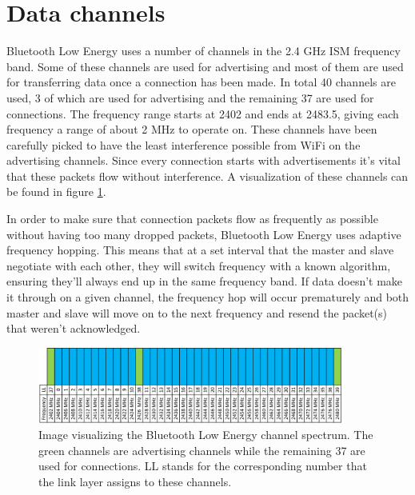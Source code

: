 \documentclass[pdftex,a4paper,12pt,twoside]{report}
\begin{document}
\section{Data channels}
\label{sec:channels}
Bluetooth Low Energy uses a number of channels in the 2.4 GHz ISM frequency band. Some of these channels are used for advertising and most of them are used for transferring data once a connection has been made. In total 40 channels are used, 3 of which are used for advertising and the remaining 37 are used for connections. The frequency range starts at 2402 and ends at 2483.5, giving each frequency a range of about 2 MHz to operate on. These channels have been carefully picked to have the least interference possible from WiFi on the advertising channels. Since every connection starts with advertisements it's vital that these packets flow without interference. A visualization of these channels can be found in figure \ref{fig:channelmap}.

In order to make sure that connection packets flow as frequently as possible without having too many dropped packets, Bluetooth Low Energy uses adaptive frequency hopping. This means that at a set interval that the master and slave negotiate with each other, they will switch frequency with a known algorithm, ensuring they'll always end up in the same frequency band. If data doesn't make it through on a given channel, the frequency hop will occur prematurely and both master and slave will move on to the next frequency and resend the packet(s) that weren't acknowledged.

\begin{figure}[h]
    \centering
    \includegraphics[width=0.9\textwidth]{img/channelmap.png}
    \caption[Image visualizing the Bluetooth Low Energy channel spectrum]{Image visualizing the Bluetooth Low Energy channel spectrum. The green channels are advertising channels while the remaining 37 are used for connections. LL stands for the corresponding number that the link layer assigns to these channels.}
    \label{fig:channelmap}
\end{figure}
\end{document}
